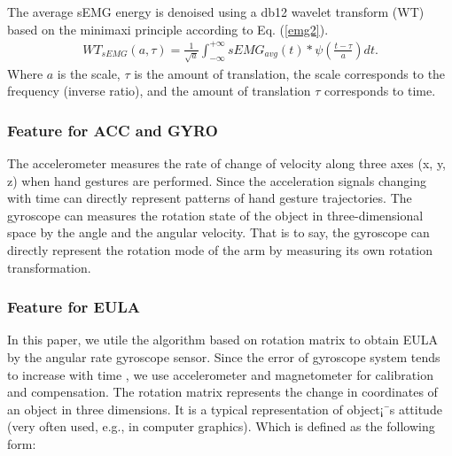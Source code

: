 \documentclass[10pt, conference, letterpaper]{IEEEtran}
\begin{document}
The average sEMG energy is denoised using a db12 wavelet transform (WT) based on the minimaxi principle according to Eq. (\ref{emg2}).
\begin{equation}
\label{emg2}
\begin{aligned}
 WT_{sEMG}(a,\tau) = \frac{1}{\sqrt{a}}\int_{-\infty}^{+\infty}sEMG_{avg}(t)*\psi(\frac{t-\tau}{a})dt.
\end{aligned}
\end{equation}
Where $a$ is the scale, $\tau$ is the amount of translation, the scale corresponds to the frequency (inverse ratio), and the amount of translation $\tau$ corresponds to time.



\subsubsection{Feature for ACC and GYRO}
The accelerometer measures the rate of change of velocity along three axes (x, y, z) when hand gestures are performed. Since the acceleration signals changing with time can directly represent patterns of hand gesture trajectories. The gyroscope can measures the rotation state of the object in three-dimensional space by the angle and the angular velocity. That is to say, the gyroscope can directly represent the rotation mode of the arm by measuring its own rotation transformation.

\subsubsection{Feature for EULA}
In this paper, we utile the algorithm based on rotation matrix to obtain EULA by the angular rate gyroscope sensor. Since the error of gyroscope system tends to increase with time , we use accelerometer and magnetometer for calibration and compensation. The rotation matrix represents the change in coordinates of an object in three dimensions. It is a typical representation of object¡¯s attitude (very often used, e.g., in computer graphics). Which is defined as the following form:
\end{document}
